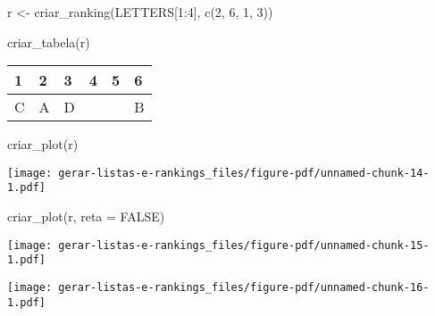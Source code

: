 \documentclass[
  letterpaper,
  DIV=11,
  numbers=noendperiod]{scrreprt}
\newenvironment{Shaded}{\begin{snugshade}}{\end{snugshade}}
\newcommand{\AttributeTok}[1]{\textcolor[rgb]{0.40,0.45,0.13}{#1}}
\newcommand{\ConstantTok}[1]{\textcolor[rgb]{0.56,0.35,0.01}{#1}}
\newcommand{\DecValTok}[1]{\textcolor[rgb]{0.68,0.00,0.00}{#1}}
\newcommand{\FunctionTok}[1]{\textcolor[rgb]{0.28,0.35,0.67}{#1}}
\newcommand{\NormalTok}[1]{\textcolor[rgb]{0.00,0.23,0.31}{#1}}
\newcommand{\OtherTok}[1]{\textcolor[rgb]{0.00,0.23,0.31}{#1}}
\newcommand{\SpecialCharTok}[1]{\textcolor[rgb]{0.37,0.37,0.37}{#1}}
\begin{document}
\begin{Shaded}
\begin{Highlighting}[]
\NormalTok{r }\OtherTok{\textless{}{-}} \FunctionTok{criar\_ranking}\NormalTok{(LETTERS[}\DecValTok{1}\SpecialCharTok{:}\DecValTok{4}\NormalTok{], }\FunctionTok{c}\NormalTok{(}\DecValTok{2}\NormalTok{, }\DecValTok{6}\NormalTok{, }\DecValTok{1}\NormalTok{, }\DecValTok{3}\NormalTok{))}
\end{Highlighting}
\end{Shaded}

\begin{Shaded}
\begin{Highlighting}[]
\FunctionTok{criar\_tabela}\NormalTok{(r)}
\end{Highlighting}
\end{Shaded}

\begin{longtable*}{llllll}
 & 2 & 3 & 4 & 5 & 6 \\ 
\midrule\addlinespace[2.5pt]
C & A & D &  &  & B \\ 
\bottomrule
\end{longtable*}

\begin{Shaded}
\begin{Highlighting}[]
\FunctionTok{criar\_plot}\NormalTok{(r)}
\end{Highlighting}
\end{Shaded}

\begin{center}
\texttt{[image: gerar-listas-e-rankings\_files/figure-pdf/unnamed-chunk-14-1.pdf]}
\end{center}

\begin{Shaded}
\begin{Highlighting}[]
\FunctionTok{criar\_plot}\NormalTok{(r, }\AttributeTok{reta =} \ConstantTok{FALSE}\NormalTok{)}
\end{Highlighting}
\end{Shaded}

\begin{center}
\texttt{[image: gerar-listas-e-rankings\_files/figure-pdf/unnamed-chunk-15-1.pdf]}
\end{center}

\begin{Shaded}
\end{Shaded}

\begin{center}
\texttt{[image: gerar-listas-e-rankings\_files/figure-pdf/unnamed-chunk-16-1.pdf]}
\end{center}
\end{document}
